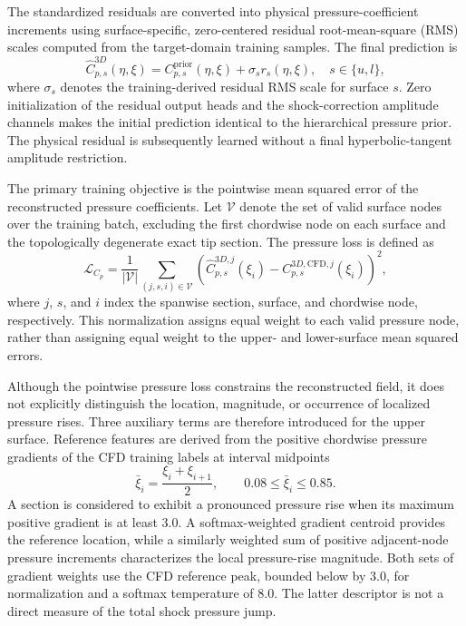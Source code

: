 The standardized residuals are converted into physical pressure-coefficient increments using surface-specific, zero-centered residual root-mean-square (RMS) scales computed from the target-domain training samples. The final prediction is
\begin{equation}
\widehat C_{p,s}^{3D}(\eta,\xi)
=
C_{p,s}^{\mathrm{prior}}(\eta,\xi)
+
\sigma_s r_s(\eta,\xi),
\quad s\in\{u,l\},
\label{eq:target-pressure-reconstruction}
\end{equation}
where $\sigma_s$ denotes the training-derived residual RMS scale for surface $s$. Zero initialization of the residual output heads and the shock-correction amplitude channels makes the initial prediction identical to the hierarchical pressure prior. The physical residual is subsequently learned without a final hyperbolic-tangent amplitude restriction.

The primary training objective is the pointwise mean squared error of the reconstructed pressure coefficients. Let $\mathcal V$ denote the set of valid surface nodes over the training batch, excluding the first chordwise node on each surface and the topologically degenerate exact tip section. The pressure loss is defined as
\begin{equation}
\mathcal L_{C_p}
=
\frac{1}{|\mathcal V|}
\sum_{(j,s,i)\in\mathcal V}
\left(
\widehat C_{p,s}^{3D,j}(\xi_i)
-
C_{p,s}^{3D,\mathrm{CFD},j}(\xi_i)
\right)^2,
\label{eq:target-pressure-mse}
\end{equation}
where $j$, $s$, and $i$ index the spanwise section, surface, and chordwise node, respectively. This normalization assigns equal weight to each valid pressure node, rather than assigning equal weight to the upper- and lower-surface mean squared errors.

Although the pointwise pressure loss constrains the reconstructed field, it does not explicitly distinguish the location, magnitude, or occurrence of localized pressure rises. Three auxiliary terms are therefore introduced for the upper surface. Reference features are derived from the positive chordwise pressure gradients of the CFD training labels at interval midpoints
\begin{equation*}
\bar{\xi}_i=\frac{\xi_i+\xi_{i+1}}{2},
\qquad 0.08\leq\bar{\xi}_i\leq0.85.
\end{equation*}
A section is considered to exhibit a pronounced pressure rise when its maximum positive gradient is at least 3.0. A softmax-weighted gradient centroid provides the reference location, while a similarly weighted sum of positive adjacent-node pressure increments characterizes the local pressure-rise magnitude. Both sets of gradient weights use the CFD reference peak, bounded below by 3.0, for normalization and a softmax temperature of 8.0. The latter descriptor is not a direct measure of the total shock pressure jump.

